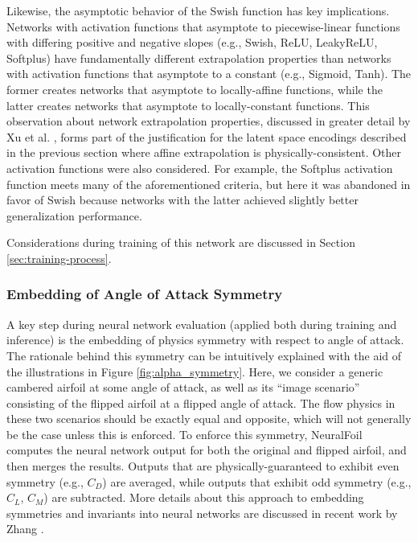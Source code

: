 \documentclass[journal]{new-aiaa}
\begin{document}
Likewise, the asymptotic behavior of the Swish function has key implications. Networks with activation functions that asymptote to piecewise-linear functions with differing positive and negative slopes (e.g., Swish, ReLU, LeakyReLU, Softplus) have fundamentally different extrapolation properties than networks with activation functions that asymptote to a constant (e.g., Sigmoid, Tanh). The former creates networks that asymptote to locally-affine functions, while the latter creates networks that asymptote to locally-constant functions. This observation about network extrapolation properties, discussed in greater detail by Xu et al. \cite{xuHowNeuralNetworks2021}, forms part of the justification for the latent space encodings described in the previous section where affine extrapolation is physically-consistent. Other activation functions were also considered. For example, the Softplus activation function meets many of the aforementioned criteria, but here it was abandoned in favor of Swish because networks with the latter achieved slightly better generalization performance.

Considerations during training of this network are discussed in Section \ref{sec:training-process}.

\subsubsection{Embedding of Angle of Attack Symmetry}

A key step during neural network evaluation (applied both during training and inference) is the embedding of physics symmetry with respect to angle of attack. The rationale behind this symmetry can be intuitively explained with the aid of the illustrations in Figure \ref{fig:alpha_symmetry}. Here, we consider a generic cambered airfoil at some angle of attack, as well as its ``image scenario'' consisting of the flipped airfoil at a flipped angle of attack. The flow physics in these two scenarios should be exactly equal and opposite, which will not generally be the case unless this is enforced. To enforce this symmetry, NeuralFoil computes the neural network output for both the original and flipped airfoil, and then merges the results. Outputs that are physically-guaranteed to exhibit even symmetry (e.g., $C_D$) are averaged, while outputs that exhibit odd symmetry (e.g., $C_L$, $C_M$) are subtracted. More details about this approach to embedding symmetries and invariants into neural networks are discussed in recent work by Zhang \cite{zhangThreedimensionalIntegralBoundary2022}.
\end{document}
